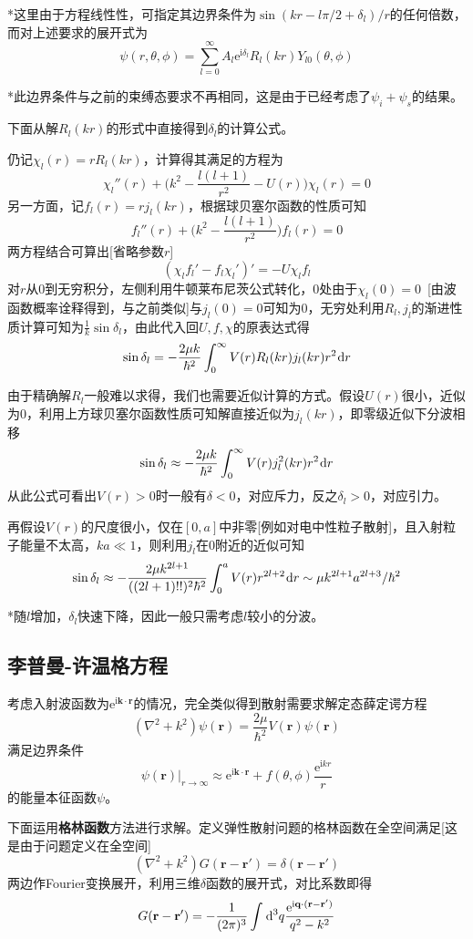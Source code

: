 \documentclass[a4paper,UTF8,fontset=windows]{ctexart}
\newcommand*{\dr}{\hspace{0.07em}\mathrm{d}}
\newcommand*{\ir}{\mathrm{i}}
\newcommand*{\er}{\mathrm{e}}
\newcommand*{\br}{\mathbf{r}}
\begin{document}
*这里由于方程线性性，可指定其边界条件为$\sin(kr-l\pi/2+\delta_l)/r$的任何倍数，而对上述要求的展开式为
$$\psi(r,\theta,\phi)=\sum_{l=0}^\infty A_l\er^{\ir\delta_l}R_l(kr)Y_{l0}(\theta,\phi)$$

*此边界条件与之前的束缚态要求不再相同，这是由于已经考虑了$\psi_i+\psi_s$的结果。

下面从解$R_l(kr)$的形式中直接得到$\delta_l$的计算公式。

仍记$\chi_l(r)=rR_l(kr)$，计算得其满足的方程为
$$\chi_l''(r)+\bigg(k^2-\frac{l(l+1)}{r^2}-U(r)\bigg)\chi_l(r)=0$$
另一方面，记$f_l(r)=rj_l(kr)$，根据球贝塞尔函数的性质可知
$$f_l''(r)+\bigg(k^2-\frac{l(l+1)}{r^2}\bigg)f_l(r)=0$$
两方程结合可算出[省略参数$r$]
$$(\chi_lf_l'-f_l\chi_l')'=-U\chi_lf_l$$
对$r$从0到无穷积分，左侧利用牛顿莱布尼茨公式转化，0处由于$\chi_l(0)=0$\ [由波函数概率诠释得到，与之前类似]与$j_l(0)=0$可知为0，无穷处利用$R_l,j_l$的渐进性质计算可知为$\frac{1}{k}\sin\delta_l$，由此代入回$U,f,\chi$的原表达式得
$$\sin\delta_l=-\frac{2\mu k}{\hbar^2}\int_0^\infty V(r)R_l(kr)j_l(kr)r^2\dr r$$

由于精确解$R_l$一般难以求得，我们也需要近似计算的方式。假设$U(r)$很小，近似为0，利用上方球贝塞尔函数性质可知解直接近似为$j_l(kr)$，即零级近似下分波相移
$$\sin\delta_l\approx-\frac{2\mu k}{\hbar^2}\int_0^\infty V(r)j_l^2(kr)r^2\dr r$$
从此公式可看出$V(r)>0$时一般有$\delta<0$，对应斥力，反之$\delta_l>0$，对应引力。

再假设$V(r)$的尺度很小，仅在$[0,a]$中非零[例如对电中性粒子散射]，且入射粒子能量不太高，$ka\ll1$，则利用$j_l$在0附近的近似可知
$$\sin\delta_l\approx-\frac{2\mu k^{2l+1}}{((2l+1)!!)^2\hbar^2}\int_0^aV(r)r^{2l+2}\dr r\sim \mu k^{2l+1}a^{2l+3}/\hbar^2$$

*随$l$增加，$\delta_l$快速下降，因此一般只需考虑$l$较小的分波。

\subsection{李普曼-许温格方程}
考虑入射波函数为$\er^{\ir\mathbf{k}\cdot\br}$的情况，完全类似得到散射需要求解定态薛定谔方程
$$(\nabla^2+k^2)\psi(\br)=\frac{2\mu}{\hbar^2}V(\br)\psi(\br)$$
满足边界条件
$$\psi(\br)\big|_{r\to\infty}\approx\er^{\ir\mathbf{k}\cdot\br}+f(\theta,\phi)\frac{\er^{\ir kr}}{r}$$
的能量本征函数$\psi$。

下面运用\textbf{格林函数}方法进行求解。定义弹性散射问题的格林函数在全空间满足[这是由于问题定义在全空间]
$$(\nabla^2+k^2)G(\br-\br')=\delta(\br-\br')$$
两边作Fourier变换展开，利用三维$\delta$函数的展开式，对比系数即得
$$G(\br-\br')=-\frac{1}{(2\pi)^3}\int\dr^3q\frac{\er^{\ir\mathbf{q}\cdot(\br-\br')}}{q^2-k^2}$$
\end{document}
